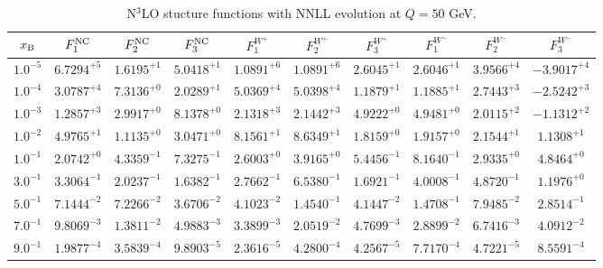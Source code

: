 \begin{table}[h]
\begin{adjustbox}{width=\textwidth}
\begin{tabular}{|c||c|c|c|c|c|c|c|c|c|}
\hline
$x_{\rm B}$ & $F_1^{\rm NC}$ & $F_2^{\rm NC}$ & $F_3^{\rm NC}$ & $F_1^{W^+}$ & $F_2^{W^+}$ & $F_3^{W^+}$ & $F_1^{W^-}$ & $F_2^{W^-}$ & $F_3^{W^-}$ \\
\hline
$ 1.0^{-5}$ & $ 6.7294^{+5}$ & $ 1.6195^{+1}$ & $ 5.0418^{+1}$ & $ 1.0891^{+6}$ & $ 1.0891^{+6}$ & $ 2.6045^{+1}$ & $ 2.6046^{+1}$ & $ 3.9566^{+4}$ & $-3.9017^{+4}$ \\
$ 1.0^{-4}$ & $ 3.0787^{+4}$ & $ 7.3136^{+0}$ & $ 2.0289^{+1}$ & $ 5.0369^{+4}$ & $ 5.0398^{+4}$ & $ 1.1879^{+1}$ & $ 1.1885^{+1}$ & $ 2.7443^{+3}$ & $-2.5242^{+3}$ \\
$ 1.0^{-3}$ & $ 1.2857^{+3}$ & $ 2.9917^{+0}$ & $ 8.1378^{+0}$ & $ 2.1318^{+3}$ & $ 2.1442^{+3}$ & $ 4.9222^{+0}$ & $ 4.9481^{+0}$ & $ 2.0115^{+2}$ & $-1.1312^{+2}$ \\
$ 1.0^{-2}$ & $ 4.9765^{+1}$ & $ 1.1135^{+0}$ & $ 3.0471^{+0}$ & $ 8.1561^{+1}$ & $ 8.6349^{+1}$ & $ 1.8159^{+0}$ & $ 1.9157^{+0}$ & $ 2.1544^{+1}$ & $ 1.1308^{+1}$ \\
$ 1.0^{-1}$ & $ 2.0742^{+0}$ & $ 4.3359^{-1}$ & $ 7.3275^{-1}$ & $ 2.6003^{+0}$ & $ 3.9165^{+0}$ & $ 5.4456^{-1}$ & $ 8.1640^{-1}$ & $ 2.9335^{+0}$ & $ 4.8464^{+0}$ \\
$ 3.0^{-1}$ & $ 3.3064^{-1}$ & $ 2.0237^{-1}$ & $ 1.6382^{-1}$ & $ 2.7662^{-1}$ & $ 6.5380^{-1}$ & $ 1.6921^{-1}$ & $ 4.0008^{-1}$ & $ 4.8720^{-1}$ & $ 1.1976^{+0}$ \\
$ 5.0^{-1}$ & $ 7.1444^{-2}$ & $ 7.2266^{-2}$ & $ 3.6706^{-2}$ & $ 4.1023^{-2}$ & $ 1.4540^{-1}$ & $ 4.1447^{-2}$ & $ 1.4708^{-1}$ & $ 7.9485^{-2}$ & $ 2.8514^{-1}$ \\
$ 7.0^{-1}$ & $ 9.8069^{-3}$ & $ 1.3811^{-2}$ & $ 4.9883^{-3}$ & $ 3.3899^{-3}$ & $ 2.0519^{-2}$ & $ 4.7699^{-3}$ & $ 2.8899^{-2}$ & $ 6.7416^{-3}$ & $ 4.0912^{-2}$ \\
$ 9.0^{-1}$ & $ 1.9877^{-4}$ & $ 3.5839^{-4}$ & $ 9.8903^{-5}$ & $ 2.3616^{-5}$ & $ 4.2800^{-4}$ & $ 4.2567^{-5}$ & $ 7.7170^{-4}$ & $ 4.7221^{-5}$ & $ 8.5591^{-4}$ \\
\hline
\end{tabular}
\end{adjustbox}\caption{N$^{3}$LO stucture functions with NNLL evolution at $Q = 50$ GeV.}
\label{tab:N3LO-Q50}
\end{table}



